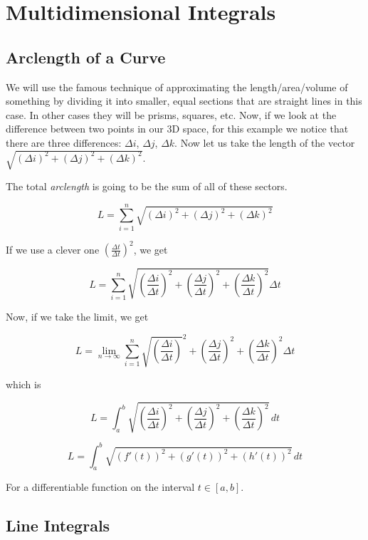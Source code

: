 \chapter{Multidimensional Integrals}

\section{Arclength of a Curve}

We will use the famous technique of approximating the length/area/volume of something
by dividing it into smaller, equal sections that are straight lines in this case. In other cases
they will be prisms, squares, etc. Now, if we look at the difference between two points in our 3D space,
for this example we notice that there are three differences: \(\Delta i\), \(\Delta j\), \(\Delta k\).
Now let us take the length of the vector \(\sqrt{{(\Delta i)}^2 + {(\Delta j)}^2 + {(\Delta k)}^2}\).

The total \emph{arclength} is going to be the sum of all of these sectors.

\[
    L =  \sum_{i = 1}^{n}\sqrt{{(\Delta i)}^2 + {(\Delta j)}^2 + {(\Delta k)}^2}
\]

If we use a clever one \( \left(\frac{\Delta t}{\Delta t}\right)^2 \), we get

\[
    L =  \sum_{i = 1}^{n} \sqrt{{\left(\frac{\Delta i}{\Delta t}\right)}^2 + {\left(\frac{\Delta j}{\Delta t}\right)}^2 + 
    {\left(\frac{\Delta k}{\Delta t}\right)}^2}\Delta t
\]

Now, if we take the limit, we get

\[
    L =  \lim_{n \to \infty} \sum_{i = 1}^{n} \sqrt{\left(\frac{\Delta i}{\Delta t}\right)}^2 + {\left(\frac{\Delta j}{\Delta t}\right)}^2 + {\left(\frac{\Delta k}{\Delta t}\right)^2}\Delta t
\]

which is 

\[
    L =  \int_{a}^{b}\sqrt{{\left(\frac{\Delta i}{\Delta t}\right)}^2 + {\left(\frac{\Delta j}{\Delta t}\right)}^2 + {\left(\frac{\Delta k}{\Delta t}\right)}^2}\,dt
\]

\[
    L =  \int_{a}^{b}\sqrt{{(f'(t))}^2 + {(g'(t))}^2 + {(h'(t))}^2}\,dt
\]

For a differentiable function on the interval \(t \in [a, b]\).

\section{Line Integrals}

